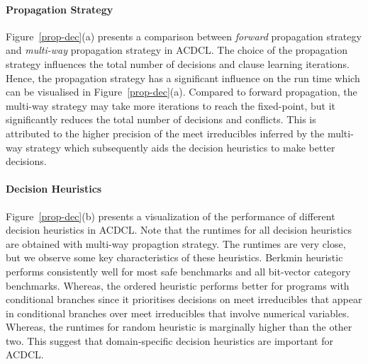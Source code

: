 \paragraph {\textbf{Propagation Strategy}}      
Figure~\ref{prop-dec}(a) presents a comparison between {\em forward} propagation 
strategy and {\em multi-way} propagation strategy in ACDCL.  The choice of the
propagation strategy influences the total number of decisions and clause 
learning iterations.  Hence, the propagation strategy has a significant 
influence on the run time which can be visualised in Figure~\ref{prop-dec}(a).  
Compared to forward propagation, the multi-way strategy may take more iterations 
to reach the fixed-point, but it significantly reduces the total number of 
decisions and conflicts.  This is attributed to the higher 
precision of the meet irreducibles inferred by the multi-way strategy which 
subsequently aids the decision heuristics to make better decisions. 


\paragraph {\textbf{Decision Heuristics}} Figure~\ref{prop-dec}(b) presents a 
visualization of the performance of different decision heuristics in ACDCL.  
Note that the runtimes for all decision heuristics are obtained with multi-way 
propagtion strategy.  The runtimes are very close, but we observe some key
characteristics of these heuristics.  Berkmin heuristic performs consistently 
well for most safe benchmarks and all bit-vector category benchmarks.  Whereas, 
the ordered heuristic performs better for programs with conditional branches 
since it prioritises decisions on meet irreducibles that appear in conditional 
branches over meet irreducibles that involve numerical variables.  Whereas, 
the runtimes for random heuristic is marginally higher than the other two.  This 
suggest that domain-specific decision heuristics are important for ACDCL.  


